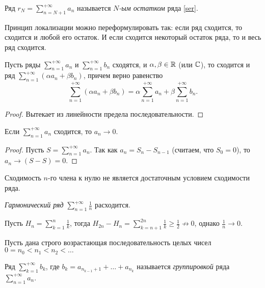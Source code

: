 \begin{note}
    Ряд $r_{N} = \sum_{n = N + 1}^{+\infty} a_{n}$ называется \textit{$N$-ым остатком} ряда \ref{ser}.
\end{note}

Принцип локализации можно переформулировать так: если ряд сходится, то сходится и любой его остаток. И если сходится некоторый остаток ряда, то и весь ряд сходится.

\begin{lemma}[Линейность]
    Пусть ряды $\sum_{n = 1}^{+\infty}a_{n}$ и $\sum_{n = 1}^{+\infty}b_{n}$ сходятся, и $\alpha, \beta \in \mathbb{R}$ (или $\mathbb{C}$), то сходится и ряд $\sum_{n = 1}^{+\infty}(\alpha a_{n} + \beta b_{n})$, причем верно равенство
    \[\sum_{n = 1}^{+\infty}(\alpha a_n + \beta b_{n}) = \alpha \sum_{n = 1}^{+\infty}a_{n} + \beta \sum_{n = 1}^{+\infty}b_{n}.\]
\end{lemma}

\begin{proof}
    Вытекает из линейности предела последовательности.
\end{proof}

\begin{lemma}
    Если $\sum_{n = 1}^{+\infty}a_{n}$ сходится, то $a_{n} \to 0$.
\end{lemma}

\begin{proof}
    Пусть $S = \sum_{n = 1}^{+\infty}a_{n}$. Так как $a_{n} = S_n - S_{n - 1}$ (считаем, что $S_{0} = 0$), то $a_{n} \to (S - S) = 0$.
\end{proof}

Сходимость $n$-го члена к нулю не является достаточным условием сходимости ряда.

\begin{example}
    \textit{Гармонический ряд} $\sum_{n = 1}^{+\infty} \frac{1}{n}$ расходится.
\end{example}

\begin{solution}
    Пусть $H_{n} = \sum_{k = 1}^{n} \frac{1}{k}$, тогда $H_{2n} - H_{n} = \sum_{k = n + 1}^{2n} \frac{1}{k} \geq \frac{1}{2} \not\to 0$, однако $\frac{1}{n} \to 0$.
\end{solution}

\begin{definition}
    Пусть дана строго возрастающая последовательность целых чисел $0 = n_0 < n_1 < n_2 < \ldots$
    
    Ряд $\sum_{k = 1}^{+\infty}b_{k}$, где $b_k = a_{n_{k-1} + 1} + \ldots + a_{n_{k}}$ называется \textit{группировкой} ряда $\sum_{n = 1}^{+\infty}a_{n}$.
\end{definition}

